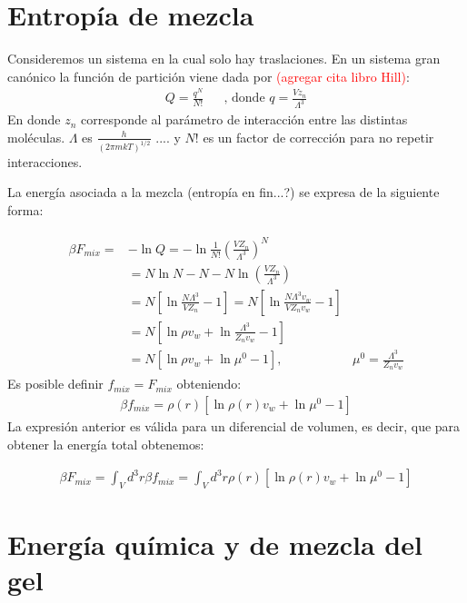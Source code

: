  
\section{Entrop\'ia de mezcla}
Consideremos un sistema en la cual solo hay traslaciones.
En un sistema gran can\'onico la funci\'on de partici\'on viene dada por \textcolor{red}{(agregar cita libro Hill)}:
\begin{align}
	Q=\frac{q^N}{N !} && \text{, donde $q=\frac{Vz_n}{\Lambda^3}$} 
\end{align}
En donde $z_n$ corresponde al par\'ametro de  interacci\'on entre las distintas mol\'eculas. $\Lambda$ es $\frac{h}{(2\pi mkT)^{1/2}}$ .... y  $N!$  es un factor de correcci\'on para no repetir interacciones.

La energ\'ia asociada a la mezcla (entrop\'ia en fin...?) se expresa de la siguiente forma:

\begin{align}
	\begin{aligned}
		\beta F_{mix}=&-\ln Q =-\ln\frac{1}{N!}\left(\frac{VZ_n}{\Lambda^3}\right)^N \\
		&= N\ln N -N -N\ln\left(\frac{VZ_n}{\Lambda^3}\right) \\
		&=N\left[\ln\frac{N\Lambda^3}{VZ_n} -1\right]= N\left[\ln\frac{N\Lambda^3v_w}{VZ_nv_w} -1\right] \\
		&=N\left[\ln\rho v_w + \ln\frac{\Lambda^3}{Z_nv_w} -1\right] \\
		&=N\left[\ln\rho v_w + \ln\mu^0 -1\right], & \mu^0=\frac{\Lambda^3}{Z_nv_w}
	\end{aligned}
\end{align}
Es posible definir $f_{mix}=F_{mix}$ obteniendo: 
\begin{align}
	\beta f_{mix}=\rho(r)\left[\ln\rho(r) v_w + \ln\mu^0 -1\right] 
\end{align}
La expresi\'on anterior es v\'alida para un diferencial de volumen, es decir, que para obtener la energ\'ia total obtenemos:

\begin{align}
	\beta F_{mix}=\int_V{d^3r\beta f_{mix}}=\int_V{d^3r\rho(r)\left[\ln\rho(r) v_w + \ln\mu^0 -1\right]} 
\end{align}


\section{Energ\'ia qu\'imica y de mezcla del gel}

